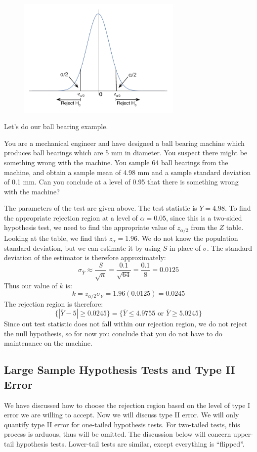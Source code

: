 \documentclass[notes.tex]{subfiles}
\begin{document}
\begin{figure}[H]
\centering
\includegraphics[width=8cm]{twotailed}
\end{figure}

Let's do our ball bearing example.

\begin{example}You are a mechanical engineer and have designed a ball bearing machine which produces ball bearings which are 5 mm in diameter. You suspect there might be something wrong with the machine. You sample 64 ball bearings from the machine, and obtain a sample mean of 4.98 mm and a sample standard deviation of 0.1 mm. Can you conclude at a level of 0.95 that there is something wrong with the machine?

The parameters of the test are given above. The test statistic is $\bar{Y} = 4.98$. To find the appropriate rejection region at a level of $\alpha = 0.05$, since this is a two-sided hypothesis test, we need to find the appropriate value of $z_{\alpha/2}$ from the $Z$ table. Looking at the table, we find that $z_\alpha = 1.96$. We do not know the population standard deviation, but we can estimate it by using $S$ in place of $\sigma$. The standard deviation of the estimator is therefore approximately:
\[
\sigma_{\bar{Y}} \approx \frac{S}{\sqrt{n}} = \frac{0.1}{\sqrt{64}} = \frac{0.1}{8} = 0.0125
\]
Thus our value of $k$ is:
\[
k = z_{\alpha/2} \sigma_{\bar{Y}} = 1.96 (0.0125) = 0.0245
\]
The rejection region is therefore:
\[
\{ |\bar{Y} - 5 | \geq 0.0245 \} = \{ \bar{Y} \leq 4.9755 \text{ or } \bar{Y} \geq 5.0245 \}
\]
Since out test statistic does not fall within our rejection region, we do not reject the null hypothesis, so for now you conclude that you do not have to do maintenance on the machine.
\end{example}

\subsection{Large Sample Hypothesis Tests and Type II Error}
We have discussed how to choose the rejection region based on the level of type I error we are willing to accept. Now we will discuss type II error. We will only quantify type II error for one-tailed hypothesis tests. For two-tailed tests, this process is arduous, thus will be omitted. The discussion below will concern upper-tail hypothesis tests. Lower-tail tests are similar, except everything is ``flipped''.\\
\end{document}
